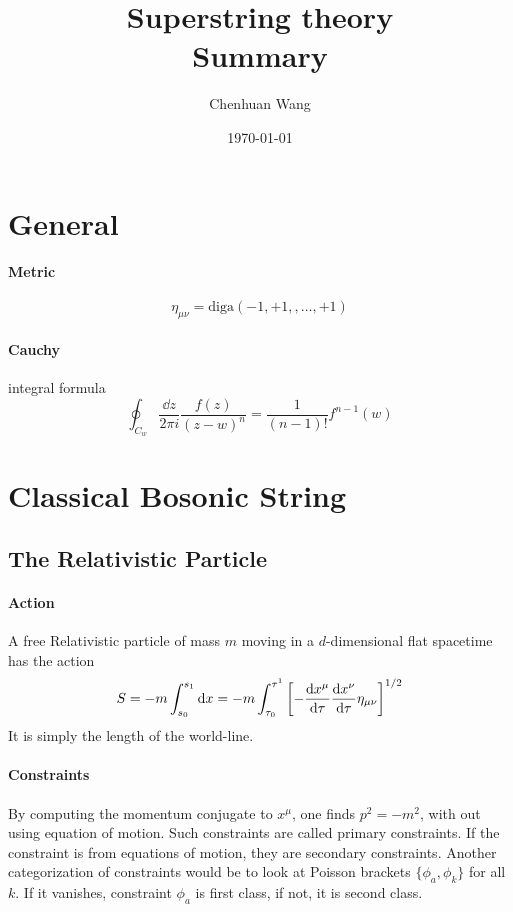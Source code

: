 \documentclass[12pt, a4paper, DIV=15]{article}
\title{Superstring theory \\ Summary}
\date{\today}
\author{Chenhuan Wang}
\numberwithin{equation}{section}
\newcommand{\diag}{\text{diga}}
\begin{document}
\maketitle

\section{General}
\paragraph{Metric}
\begin{equation}
	\eta_{\mu\nu} = \diag(-1, +1, , \dots, +1)
\end{equation}

\paragraph{Cauchy} integral formula
\begin{equation}
	\oint_{C_w} \frac{\dd{z}}{2\pi i } \frac{f(z)}{(z-w)^n} = \frac{1}{(n-1)!} f^{n-1} (w)
\end{equation}
\section{Classical Bosonic String}
\subsection{The Relativistic Particle}
\paragraph{Action}
A free Relativistic particle of mass $m$ moving in a $d$-dimensional flat spacetime has the action
\begin{equation}
	S = - m \int_{s_0}^{s_1} \dd{x} = -m \int_{\tau_0}^{\tau^1} \left[ - \dv{x^\mu}{\tau} \dv{x^\nu}{\tau} \eta_{\mu\nu} \right]^{1/2}
	\label{math:rel-part}
\end{equation}
It is simply the length of the world-line.

\paragraph{Constraints} By computing the momentum conjugate to $x^\mu$, one finds $p^2 = -m^2$, with out using equation of motion. Such constraints are called {primary constraints}. If the constraint is from equations of motion, they are {secondary constraints}. Another categorization of constraints would be to look at Poisson brackets $\{\phi_a, \phi_k\}$ for all $k$. If it vanishes, constraint $\phi_a$ is {first class}, if not, it is {second class}.
\end{document}
